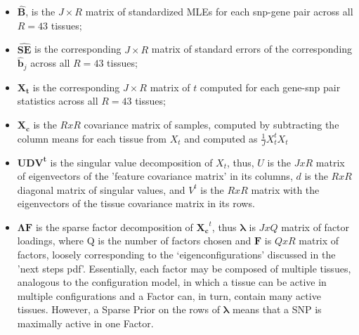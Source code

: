 \documentclass[10pt]{article}
\newcommand{\tmat}{\mathbf{X_{t}}}
\newcommand{\tcen}{\mathbf{X_{c}}}
\newcommand{\svd}{\mathbf{U} \mathbf{D} \mathbf{V^{t}}}
\newcommand{\sfa}{\mathbf{\Lambda}\mathbf{F}}
\begin{document}
\begin{itemize}
\item $\mathbf{\hat{B}}$, is the $J \times R$ matrix of standardized MLEs for each snp-gene pair across all $R=43$ tissues;
\item $\mathbf{\hat{SE}}$ is the corresponding $J \times R$ matrix of standard errors of the corresponding $\hat{\bm{b}}_{j}$ across all $R=43$ tissues;
\item $\tmat$ is the corresponding $J \times R$ matrix of $t$ computed for each gene-snp pair statistics across all $R=43$ tissues;
\item $\tcen$ is the $RxR$ covariance matrix of samples, computed by subtracting the column means for each tissue from $X_{t}$ and computed as $\frac{1}{J} X_{t}^{t} X_{t}$
\item $\svd$ is the singular value decomposition of $X_{t}$, thus, $U$ is the $JxR$ matrix of eigenvectors of the 'feature covariance matrix' in its columns, $d$ is the $RxR$ diagonal matrix of singular values, and $V^{t}$ is the $RxR$ matrix with the eigenvectors of the tissue covariance matrix in its rows.
\item $\sfa$ is the sparse factor decomposition of $\tcen^{t}$, thus $\mathbf{\lambda}$ is $JxQ$ matrix of factor loadings, where Q is the number of factors chosen and ${\mathbf{F}}$ is $QxR$ matrix of factors, loosely corresponding to the `eigenconfigurations' discussed in the 'next steps pdf'. Essentially, each factor may be composed of multiple tissues, analogous to the configuration model, in which a tissue can be active in multiple configurations and a Factor can, in turn, contain many active tissues. However, a Sparse Prior on the rows of ${\mathbf{\lambda}}$ means that a SNP is maximally active in one Factor.

\end{itemize}
\end{document}
